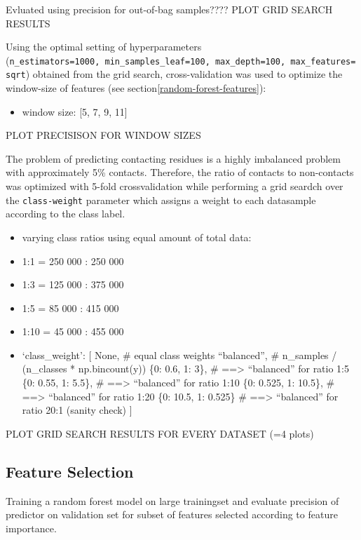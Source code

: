 \documentclass[12pt,a4paper,twoside]{book}
\providecommand{\tightlist}{%
  \setlength{\itemsep}{0pt}\setlength{\parskip}{0pt}}
\theoremstyle{definition}
\theoremstyle{definition}
\theoremstyle{remark}
\begin{document}
Evluated using precision for out-of-bag samples???? PLOT GRID SEARCH
RESULTS

Using the optimal setting of hyperparameters
(\texttt{n\_estimators=1000,\ min\_samples\_leaf=100,\ max\_depth=100,\ max\_features=sqrt})
obtained from the grid search, cross-validation was used to optimize the
window-size of features (see section\ref{random-forest-features}):

\begin{itemize}
\tightlist
\item
  window size: {[}5, 7, 9, 11{]}
\end{itemize}

PLOT PRECISISON FOR WINDOW SIZES

The problem of predicting contacting residues is a highly imbalanced
problem with approximately 5\% contacts. Therefore, the ratio of
contacts to non-contacts was optimized with 5-fold crossvalidation while
performing a grid seardch over the \texttt{class-weight} parameter which
assigns a weight to each datasample according to the class label.

\begin{itemize}
\tightlist
\item
  varying class ratios using equal amount of total data:
\item
  1:1 = 250 000 : 250 000
\item
  1:3 = 125 000 : 375 000
\item
  1:5 = 85 000 : 415 000
\item
  1:10 = 45 000 : 455 000
\item
  `class\_weight': {[} None, \# equal class weights ``balanced'', \#
  n\_samples / (n\_classes * np.bincount(y)) \{0: 0.6, 1: 3\}, \#
  ==\textgreater{} ``balanced'' for ratio 1:5 \{0: 0.55, 1: 5.5\}, \#
  ==\textgreater{} ``balanced'' for ratio 1:10 \{0: 0.525, 1: 10.5\}, \#
  ==\textgreater{} ``balanced'' for ratio 1:20 \{0: 10.5, 1: 0.525\} \#
  ==\textgreater{} ``balanced'' for ratio 20:1 (sanity check) {]}
\end{itemize}

PLOT GRID SEARCH RESULTS FOR EVERY DATASET (=4 plots)

\subsection{Feature Selection}\label{feature-selection}

Training a random forest model on large trainingset and evaluate
precision of predictor on validation set for subset of features selected
according to feature importance.
\end{document}
